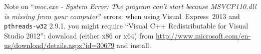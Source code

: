 Note on ``\emph{moc.exe - System Error: The program can't start
  because MSVCP110.dll is missing from your computer}'' errors: when using Visual~Express~2013 and \texttt{pthreads-w32} 2.9.1, you might require ``Visual C++ Redistributable for Visual Studio 2012'': download (either x86 or x64) from \url{http://www.microsoft.com/en-us/download/details.aspx?id=30679} and install.
